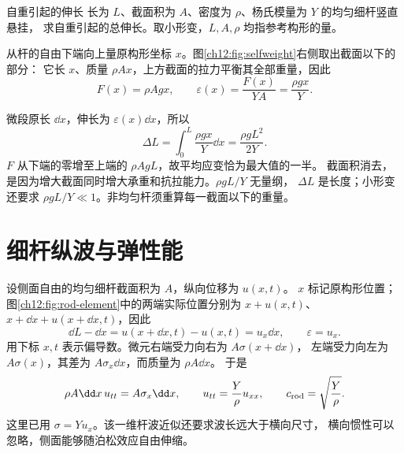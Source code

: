 \begin{origexamplebox}{自重引起的伸长}
\label{ch12:ex:01}
长为 $L$、截面积为 $A$、密度为 $\rho$、杨氏模量为 $Y$ 的均匀细杆竖直悬挂，
求自重引起的总伸长。取小形变，$L,A,\rho$ 均指参考构形的量。
\end{origexamplebox}
\begin{xesolution}
从杆的自由下端向上量原构形坐标 $x$。图\ref{ch12:fig:selfweight}右侧取出截面以下的部分：
它长 $x$、质量 $\rho Ax$，上方截面的拉力平衡其全部重量，因此
\[
 F(x)=\rho Agx,\qquad \varepsilon(x)=\frac{F(x)}{YA}=\frac{\rho gx}{Y}.
\]
\begin{center}
\label{ch12:fig:selfweight}
\end{center}
微段原长 $\dd x$，伸长为 $\varepsilon(x)\dd x$，所以
\[
 \boxed{\Delta L=\int_0^L\frac{\rho gx}{Y}\dd x=\frac{\rho gL^2}{2Y}}.
\]
$F$ 从下端的零增至上端的 $\rho AgL$，故平均应变恰为最大值的一半。
截面积消去，是因为增大截面同时增大承重和抗拉能力。$\rho gL/Y$ 无量纲，
$\Delta L$ 是长度；小形变还要求 $\rho gL/Y\ll1$。非均匀杆须重算每一截面以下的重量。
\end{xesolution}

\section{细杆纵波与弹性能}

设侧面自由的均匀细杆截面积为 $A$，纵向位移为 $u(x,t)$。
$x$ 标记原构形位置；图\ref{ch12:fig:rod-element}中的两端实际位置分别为
$x+u(x,t)$、$x+\dd x+u(x+\dd x,t)$，因此
\[
 \dd L-\dd x=u(x+\dd x,t)-u(x,t)=u_x\dd x,\qquad\varepsilon=u_x.
\]
用下标 $x,t$ 表示偏导数。微元右端受力向右为 $A\sigma(x+\dd x)$，
左端受力向左为 $A\sigma(x)$，其差为 $A\sigma_x\dd x$，而质量为 $\rho A\dd x$。
于是
\begin{equation}
 \rho A\dd x\,u_{tt}=A\sigma_x\dd x,\qquad
 u_{tt}=\frac{Y}{\rho}u_{xx},\qquad c_{\rm rod}=\sqrt{\frac{Y}{\rho}}.
 \label{ch12:eq:rod-wave}
\end{equation}
这里已用 $\sigma=Yu_x$。该一维杆波近似还要求波长远大于横向尺寸，
横向惯性可以忽略，侧面能够随泊松效应自由伸缩。

